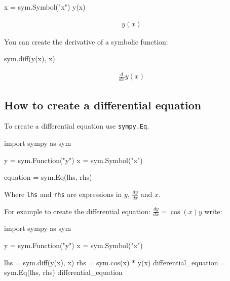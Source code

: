 \begin{pyin}
x = sym.Symbol("x")
y(x)
\end{pyin}




\begin{equation*}
\begin{split}\displaystyle y{\left(x \right)}\end{split}
\end{equation*}




You can create the derivative of a symbolic function:




\begin{pyin}
sym.diff(y(x), x)
\end{pyin}




\begin{equation*}
\begin{split}\displaystyle \frac{d}{d x} y{\left(x \right)}\end{split}
\end{equation*}




\subsection{How to create a differential equation}
\label{\detokenize{tools-for-mathematics/09-differential-equations/how/main:how-to-create-a-differential-equation}}

To create a differential equation use \texttt{sympy.Eq}.


\begin{pyin}
import sympy as sym

y = sym.Function("y")
x = sym.Symbol("x")

equation = sym.Eq(lhs, rhs)
\end{pyin}



Where \texttt{lhs} and \texttt{rhs} are expressions in \(y\), \(\frac{dy}{dx}\) and \(x\).


For example to create the differential equation: \(\frac{dy}{dx} = \cos(x) y\)
write:




\begin{pyin}
import sympy as sym

y = sym.Function("y")
x = sym.Symbol("x")

lhs = sym.diff(y(x), x)
rhs = sym.cos(x) * y(x)
differential_equation = sym.Eq(lhs, rhs)
differential_equation
\end{pyin}




